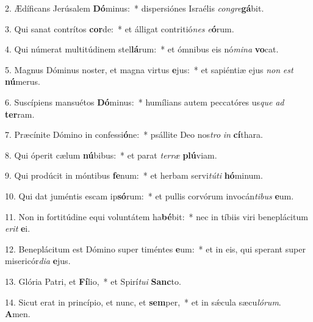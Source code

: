 2. Ædíficans Jerúsalem \textbf{Dó}minus:~*  dispersiónes Israélis \textit{con}\textit{gre}\textbf{gá}bit.\

3. Qui sanat contrítos \textbf{cor}de:~*  et álligat contritió\textit{nes} \textit{e}\textbf{ó}rum.\

4. Qui númerat multitúdinem stel\textbf{lá}rum:~*  et ómnibus eis nó\textit{mi}\textit{na} \textbf{vo}cat.\

5. Magnus Dóminus noster, et magna virtus \textbf{e}jus:~*  et sapiéntiæ ejus \textit{non} \textit{est} \textbf{nú}merus.\

6. Suscípiens mansuétos \textbf{Dó}minus:~*  humílians autem peccatóres us\textit{que} \textit{ad} \textbf{ter}ram.\

7. Præcínite Dómino in confessi\textbf{ó}ne:~*  psállite Deo nos\textit{tro} \textit{in} \textbf{cí}thara.\

8. Qui óperit cælum \textbf{nú}bibus:~*  et parat \textit{ter}\textit{ræ} \textbf{plú}viam.\

9. Qui prodúcit in móntibus \textbf{fe}num:~*  et herbam servi\textit{tú}\textit{ti} \textbf{hó}minum.\

10. Qui dat juméntis escam ip\textbf{só}rum:~*  et pullis corvórum invocán\textit{ti}\textit{bus} \textbf{e}um.\

11. Non in fortitúdine equi voluntátem ha\textbf{bé}bit:~*  nec in tíbiis viri beneplácitum \textit{e}\textit{rit} \textbf{e}i.\

12. Beneplácitum est Dómino super timéntes \textbf{e}um:~*  et in eis, qui sperant super misericór\textit{di}\textit{a} \textbf{e}jus.\

13. Glória Patri, et \textbf{Fí}lio,~*  et Spirí\textit{tu}\textit{i} \textbf{Sanc}to.\

14. Sicut erat in princípio, et nunc, et \textbf{sem}per,~*  et in sǽcula sæcu\textit{ló}\textit{rum}. \textbf{A}men.\

